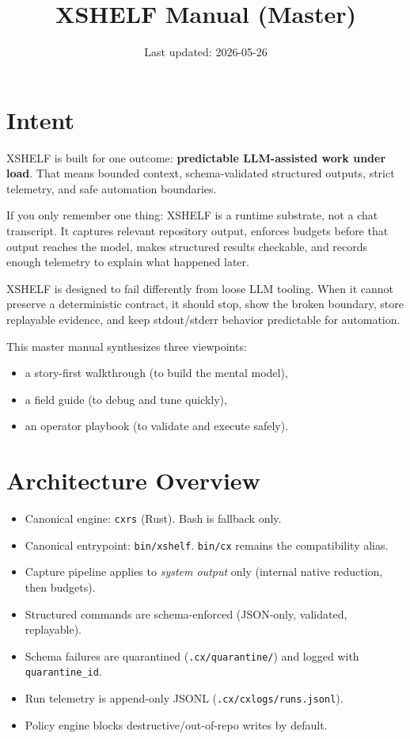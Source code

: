 \documentclass[11pt]{article}
\title{XSHELF Manual (Master)}
\author{}
\date{Last updated: 2026-05-26}
\begin{document}
\maketitle
\vspace{-0.6em}

\section*{Intent}
XSHELF is built for one outcome: \textbf{predictable LLM-assisted work under load}.
That means bounded context, schema-validated structured outputs, strict telemetry, and safe
automation boundaries.

If you only remember one thing: XSHELF is a runtime substrate, not a chat transcript.
It captures relevant repository output, enforces budgets before that output reaches the model,
makes structured results checkable, and records enough telemetry to explain what happened later.

XSHELF is designed to fail differently from loose LLM tooling. When it cannot preserve a
deterministic contract, it should stop, show the broken boundary, store replayable evidence,
and keep stdout/stderr behavior predictable for automation.

This master manual synthesizes three viewpoints:
\begin{itemize}
  \item a story-first walkthrough (to build the mental model),
  \item a field guide (to debug and tune quickly),
  \item an operator playbook (to validate and execute safely).
\end{itemize}

\section*{Architecture Overview}
\begin{itemize}
  \item Canonical engine: \texttt{cxrs} (Rust). Bash is fallback only.
  \item Canonical entrypoint: \texttt{bin/xshelf}. \texttt{bin/cx} remains the compatibility alias.
  \item Capture pipeline applies to \emph{system output} only (internal native reduction, then budgets).
  \item Structured commands are schema-enforced (JSON-only, validated, replayable).
  \item Schema failures are quarantined (\texttt{.cx/quarantine/}) and logged with \texttt{quarantine\_id}.
  \item Run telemetry is append-only JSONL (\texttt{.cx/cxlogs/runs.jsonl}).
  \item Policy engine blocks destructive/out-of-repo writes by default.
\end{itemize}
\end{document}
